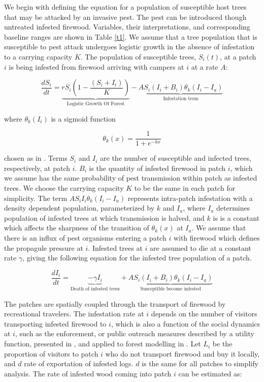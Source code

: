  We begin with defining the equation for a population of susceptible host trees that may be attacked by an invasive pest. The pest can be introduced though untreated infested firewood. Variables, their interpretations, and corresponding baseline ranges are shown in Table \ref{t1}. We assume that a tree population that is susceptible to pest attack undergoes logistic growth in the absence of infestation to a carrying capacity $K$. The population of susceptible trees, $S_i(t)$, at a patch $i$ is being infested from firewood arriving with campers at $i$ at a rate $A$: 

\begin{equation}
\frac{d S_i}{dt} = \underbrace{ r S_i\left(1 - \frac{(S_i + I_i)}{K}\right)}_{\text{Logistic Growth Of Forest}} - \underbrace{A S_i (I_i + B_i)\theta_k(I_i - I_a)}_{\text{Infestation term}}
\label{S_1}
\end{equation}

where $\theta_k(I_i)$ is a sigmoid function 

\begin{equation}
    \theta_k(x) = \frac{1}{1 + e^{-k x}}
\end{equation}

 chosen as in \cite{barlow2014modelling}. Terms $S_i$ and $I_i$ are the number of susceptible and infected trees, respectively, at patch $i$. $B_i$ is the quantity of infested firewood in patch $i$, which we assume has the same probability of pest transmission within patch as infested trees. We choose the carrying capacity $K$ to be the same in each patch for simplicity. The term $A S_i I_i\theta_k(I_i - I_a)$ represents intra-patch infestation with a density dependent population, parameterized by $k$ and $I_a$, where $I_a$ determines population of infested trees at which transmission is halved, and $k$ is is a constant which affects the sharpness of the transition of $\theta_k(x)$ at $I_a$. We assume that there is an influx of pest organisms entering a patch $i$ with firewood which defines the propagule pressure at $i$. Infested trees at $i$ are assumed to die at a constant rate $\gamma$, giving the following equation for the infested tree population of a patch.


\begin{equation}
\frac{d I_i}{dt} = \underbrace{-\gamma I_i}_{\text{Death of infested trees}} + \underbrace{A S_i (I_i + B_i)\theta_k(I_i - I_a)}_{\text{Susceptible become infested}}
\end{equation}

The patches are spatially coupled through the transport of firewood by recreational travelers. The infestation rate at $i$ depends on the number of visitors transporting infested firewood to $i$, which is also a function of the social dynamics at $i$, such as the enforcement, or public outreach measures described by a utility function, presented in \cite{bauch2005imitation}, and applied to forest modelling in \cite{barlow2014modelling,satake2007coupled}. Let $L_i$ be the proportion of visitors to patch $i$ who do not transport firewood and buy it locally, and $d$ rate of exportation of infested logs. $d$ is the same for all patches to simplify analysis. The rate of infested wood coming into patch $i$ can be estimated as:

